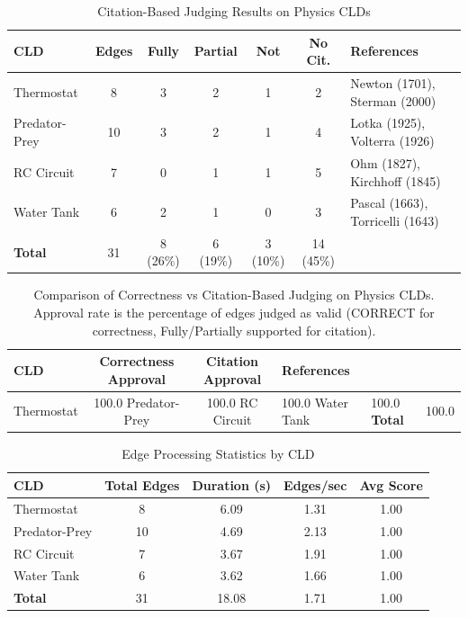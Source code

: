 \begin{table}[htbp]
\centering
\caption{Citation-Based Judging Results on Physics CLDs}
\label{tab:physics-citation-results}
\begin{tabular}{lcccccl}
\toprule
\textbf{CLD} & \textbf{Edges} & \textbf{Fully} & \textbf{Partial} & \textbf{Not} & \textbf{No Cit.} & \textbf{References} \\
\midrule
Thermostat & 8 & 3 & 2 & 1 & 2 & Newton (1701), Sterman (2000) \\
Predator-Prey & 10 & 3 & 2 & 1 & 4 & Lotka (1925), Volterra (1926) \\
RC Circuit & 7 & 0 & 1 & 1 & 5 & Ohm (1827), Kirchhoff (1845) \\
Water Tank & 6 & 2 & 1 & 0 & 3 & Pascal (1663), Torricelli (1643) \\
\midrule
\textbf{Total} & 31 & 8 (26\%) & 6 (19\%) & 3 (10\%) & 14 (45\%) & \\
\bottomrule
\end{tabular}
\end{table}


\begin{table}[htbp]
\centering
\caption{Comparison of Correctness vs Citation-Based Judging on Physics CLDs. Approval rate is the percentage of edges judged as valid (CORRECT for correctness, Fully/Partially supported for citation).}
\label{tab:physics-comparison}
\begin{tabular}{lccl}
\toprule
\textbf{CLD} & \textbf{Correctness Approval} & \textbf{Citation Approval} & \textbf{References} \\
\midrule
Thermostat & 100.0%
Predator-Prey & 100.0%
RC Circuit & 100.0%
Water Tank & 100.0%
\midrule
\textbf{Total} & 100.0%
\bottomrule
\end{tabular}
\end{table}


\begin{table}[htbp]
\centering
\caption{Edge Processing Statistics by CLD}
\label{tab:physics-edge-stats}
\begin{tabular}{lcccc}
\toprule
\textbf{CLD} & \textbf{Total Edges} & \textbf{Duration (s)} & \textbf{Edges/sec} & \textbf{Avg Score} \\
\midrule
Thermostat & 8 & 6.09 & 1.31 & 1.00 \\
Predator-Prey & 10 & 4.69 & 2.13 & 1.00 \\
RC Circuit & 7 & 3.67 & 1.91 & 1.00 \\
Water Tank & 6 & 3.62 & 1.66 & 1.00 \\
\midrule
\textbf{Total} & 31 & 18.08 & 1.71 & 1.00 \\
\bottomrule
\end{tabular}
\end{table}
